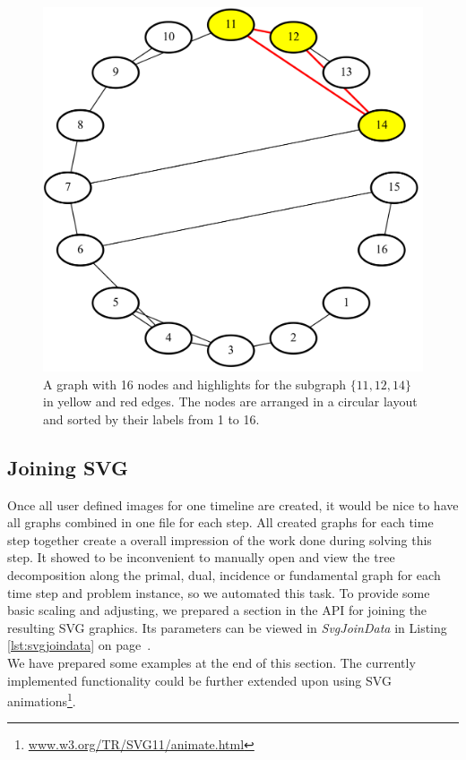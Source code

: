 \documentclass[a4paper, 12pt, bibliography=totoc]{scrartcl}
\begin{document}
\begin{figure}[H]
	\centering
	\includegraphics[width=0.6\linewidth]{images/minvc16graph9sorted.png}
	\caption[Graph with 16 nodes on a circle]{A graph with 16 nodes and highlights for the subgraph $\{11,12,14\}$ in yellow and red edges. The nodes are arranged in a circular layout and sorted by their labels from 1 to 16.}
	\label{fig:minvc16graph9sorted}
\end{figure}

\subsection{Joining SVG}\label{sec:svgjoin}
Once all user defined images for one timeline are created, it would be nice to have all graphs combined in one file for each step. All created graphs for each time step together create a overall impression of the work done during solving this step. It showed to be inconvenient to manually open and view the tree decomposition along the primal, dual, incidence or fundamental graph for each time step and problem instance, so we automated this task.
 To provide some basic scaling and adjusting, we prepared a section in the API for joining the resulting SVG graphics.
Its parameters can be viewed in \textit{SvgJoinData} in Listing \ref{lst:svgjoindata} on page~\pageref{lst:svgjoindata}. \\
We have prepared some examples at the end of this section.
The currently implemented functionality could be further extended upon using SVG animations\footnote{\url{www.w3.org/TR/SVG11/animate.html}}.\\

\end{document}
